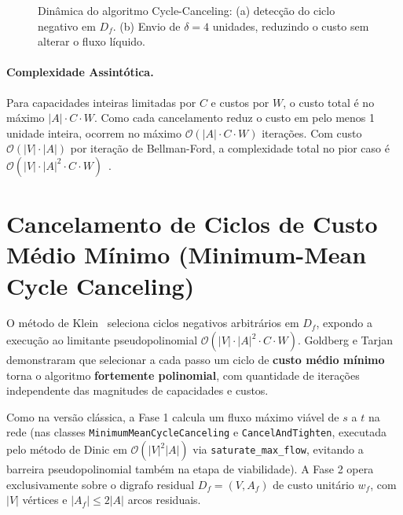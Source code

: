 \begin{figure}[!ht]
\caption{Dinâmica do algoritmo Cycle-Canceling: (a) detecção do ciclo negativo em $D_f$. (b) Envio de $\delta=4$ unidades, reduzindo o custo sem alterar o fluxo líquido.}
\label{fig:cycle_canceling_exec}
\end{figure}

\paragraph{Complexidade Assintótica.}
Para capacidades inteiras limitadas por $C$ e custos por $W$, o custo total é no máximo $|A| \cdot C \cdot W$. Como cada cancelamento reduz o custo em pelo menos 1 unidade inteira, ocorrem no máximo $\mathcal{O}(|A| \cdot C \cdot W)$ iterações. Com custo $\mathcal{O}(|V| \cdot |A|)$ por iteração de Bellman-Ford, a complexidade total no pior caso é $\mathcal{O}(|V| \cdot |A|^2 \cdot C \cdot W)$~\cite{ahuja1993network}.


\section{Cancelamento de Ciclos de Custo Médio Mínimo (Minimum-Mean Cycle Canceling)}\label{sec:mmcc}

O método de Klein~\cite{klein1967primal} seleciona ciclos negativos arbitrários em $D_f$, expondo a execução ao limitante pseudopolinomial $\mathcal{O}(|V| \cdot |A|^2 \cdot C \cdot W)$. Goldberg e Tarjan~\cite{goldberg1989finding} demonstraram que selecionar a cada passo um ciclo de \textbf{custo médio mínimo} torna o algoritmo \textbf{fortemente polinomial}, com quantidade de iterações independente das magnitudes de capacidades e custos.

Como na versão clássica, a Fase 1 calcula um fluxo máximo viável de $s$ a $t$ na rede (nas classes \lstinline{MinimumMeanCycleCanceling} e \lstinline{CancelAndTighten}, executada pelo método de Dinic em $\mathcal{O}(|V|^2 |A|)$ via \lstinline{saturate_max_flow}, evitando a barreira pseudopolinomial também na etapa de viabilidade). A Fase 2 opera exclusivamente sobre o digrafo residual $D_f = (V, A_f)$ de custo unitário $w_f$, com $|V|$ vértices e $|A_f| \le 2|A|$ arcos residuais.

